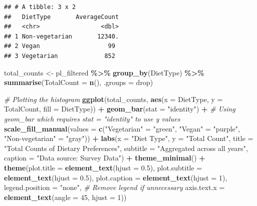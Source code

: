 \documentclass[
]{article}
\newenvironment{Shaded}{\begin{snugshade}}{\end{snugshade}}
\newcommand{\AttributeTok}[1]{\textcolor[rgb]{0.13,0.29,0.53}{#1}}
\newcommand{\CommentTok}[1]{\textcolor[rgb]{0.56,0.35,0.01}{\textit{#1}}}
\newcommand{\DecValTok}[1]{\textcolor[rgb]{0.00,0.00,0.81}{#1}}
\newcommand{\FloatTok}[1]{\textcolor[rgb]{0.00,0.00,0.81}{#1}}
\newcommand{\FunctionTok}[1]{\textcolor[rgb]{0.13,0.29,0.53}{\textbf{#1}}}
\newcommand{\NormalTok}[1]{#1}
\newcommand{\OtherTok}[1]{\textcolor[rgb]{0.56,0.35,0.01}{#1}}
\newcommand{\SpecialCharTok}[1]{\textcolor[rgb]{0.81,0.36,0.00}{\textbf{#1}}}
\newcommand{\StringTok}[1]{\textcolor[rgb]{0.31,0.60,0.02}{#1}}
\begin{document}
\begin{verbatim}
## # A tibble: 3 x 2
##   DietType       AverageCount
##   <chr>                 <dbl>
## 1 Non-vegetarian       12340.
## 2 Vegan                   99 
## 3 Vegetarian             852
\end{verbatim}

\begin{Shaded}
\begin{Highlighting}[]
\NormalTok{total\_counts }\OtherTok{\textless{}{-}}\NormalTok{ pl\_filtered }\SpecialCharTok{\%\textgreater{}\%}
  \FunctionTok{group\_by}\NormalTok{(DietType) }\SpecialCharTok{\%\textgreater{}\%}
  \FunctionTok{summarise}\NormalTok{(}\AttributeTok{TotalCount =} \FunctionTok{n}\NormalTok{(), }\AttributeTok{.groups =} \StringTok{\textquotesingle{}drop\textquotesingle{}}\NormalTok{)}

\CommentTok{\# Plotting the histogram}
\FunctionTok{ggplot}\NormalTok{(total\_counts, }\FunctionTok{aes}\NormalTok{(}\AttributeTok{x =}\NormalTok{ DietType, }\AttributeTok{y =}\NormalTok{ TotalCount, }\AttributeTok{fill =}\NormalTok{ DietType)) }\SpecialCharTok{+}
  \FunctionTok{geom\_bar}\NormalTok{(}\AttributeTok{stat =} \StringTok{"identity"}\NormalTok{) }\SpecialCharTok{+}  \CommentTok{\# Using geom\_bar which requires stat = "identity" to use y values}
  \FunctionTok{scale\_fill\_manual}\NormalTok{(}\AttributeTok{values =} \FunctionTok{c}\NormalTok{(}\StringTok{"Vegetarian"} \OtherTok{=} \StringTok{"green"}\NormalTok{, }\StringTok{"Vegan"} \OtherTok{=} \StringTok{"purple"}\NormalTok{, }\StringTok{"Non{-}vegetarian"} \OtherTok{=} \StringTok{"gray"}\NormalTok{)) }\SpecialCharTok{+}
  \FunctionTok{labs}\NormalTok{(}\AttributeTok{x =} \StringTok{"Diet Type"}\NormalTok{, }\AttributeTok{y =} \StringTok{"Total Count"}\NormalTok{,}
       \AttributeTok{title =} \StringTok{"Total Counts of Dietary Preferences"}\NormalTok{,}
       \AttributeTok{subtitle =} \StringTok{"Aggregated across all years"}\NormalTok{,}
       \AttributeTok{caption =} \StringTok{"Data source: Survey Data"}\NormalTok{) }\SpecialCharTok{+}
  \FunctionTok{theme\_minimal}\NormalTok{() }\SpecialCharTok{+}
  \FunctionTok{theme}\NormalTok{(}\AttributeTok{plot.title =} \FunctionTok{element\_text}\NormalTok{(}\AttributeTok{hjust =} \FloatTok{0.5}\NormalTok{),}
        \AttributeTok{plot.subtitle =} \FunctionTok{element\_text}\NormalTok{(}\AttributeTok{hjust =} \FloatTok{0.5}\NormalTok{),}
        \AttributeTok{plot.caption =} \FunctionTok{element\_text}\NormalTok{(}\AttributeTok{hjust =} \DecValTok{1}\NormalTok{),}
        \AttributeTok{legend.position =} \StringTok{"none"}\NormalTok{,  }\CommentTok{\# Remove legend if unnecessary}
        \AttributeTok{axis.text.x =} \FunctionTok{element\_text}\NormalTok{(}\AttributeTok{angle =} \DecValTok{45}\NormalTok{, }\AttributeTok{hjust =} \DecValTok{1}\NormalTok{))}
\end{Highlighting}
\end{Shaded}
\end{document}
